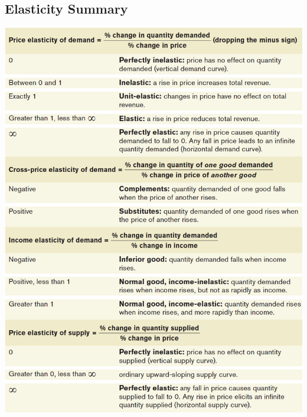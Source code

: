 \documentclass[english,course]{Notes}
\begin{document}
\subsection{Elasticity Summary}
\includegraphics[height=1.1\textwidth]{elasticSum}
 
 \newpage
\nocite{*}
\printbibliography
\end{document}
